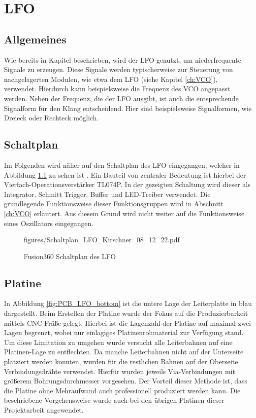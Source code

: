 \chapter{LFO}
\label{ch:LFO}

\section{Allgemeines}
Wie bereits in Kapitel \label{ch:concept} beschrieben, wird der LFO genutzt, um niederfrequente Signale zu erzeugen. 
Diese Signale werden typischerweise zur Steuerung von nachgelagerten Modulen, wie etwa dem LFO (siehe Kapitel \ref{ch:VCO}), verwendet.
Hierdurch kann beispielsweise die Frequenz des VCO angepasst werden. 
Neben der Frequenz, die der LFO ausgibt, ist auch die entsprechende Signalform für den Klang entscheidend. Hier sind beispielsweise Signalformen, wie Dreieck oder Rechteck möglich.

\section{Schaltplan}

Im Folgenden wird näher auf den Schaltplan des LFO eingegangen, welcher in Abbildung \ref{fig:LFO_Stromlaufplan} zu sehen ist \cite{lfo_manual}. 
Ein Bauteil von zentraler Bedeutung ist hierbei der Vierfach-Operationsverstärker TL074P. In der gezeigten Schaltung wird dieser als Integrator, Schmitt Trigger, Buffer und LED-Treiber verwendet.
Die grundlegende Funktionsweise dieser Funktionsgruppen wird in Abschnitt \ref{ch:VCO} erläutert. Aus diesem Grund wird nicht weiter auf die Funktionsweise eines Oszillators eingegangen.

\newpage
\begin{figure}[h]
\centering
 {figures/Schaltplan_LFO_Kirschner_08_12_22.pdf}
\caption{Fusion360 Schaltplan des LFO}
\label{fig:LFO_Stromlaufplan}
\end{figure}
\FloatBarrier
 
\newpage

\section{Platine}

In Abbildung \ref{fig:PCB_LFO_bottom} ist die untere Lage der Leiterplatte in blau dargestellt. 
Beim Erstellen der Platine wurde der Fokus auf die Produzierbarkeit mittels CNC-Fräße gelegt. 
Hierbei ist die Lagenzahl der Platine auf maximal  zwei Lagen begrenzt, wobei nur einlagiges Platinenrohmaterial zur Verfügung stand. 
Um diese Limitation zu umgehen wurde versucht alle Leiterbahnen auf eine Platinen-Lage zu entflechten. 
Da manche Leiterbahnen nicht auf der Unterseite platziert werden konnten, wurden für die restlichen Bahnen auf der Oberseite Verbindungsdrähte verwendet. 
Hierfür wurden jeweils Via-Verbindungen mit größerem Bohrungsdurchmesser vorgesehen.
Der Vorteil dieser Methode ist, dass die Platine ohne Mehraufwand auch professionell produziert werden kann. 
Die beschriebene Vorgehensweise wurde auch bei den übrigen Platinen dieser Projektarbeit angewendet.

